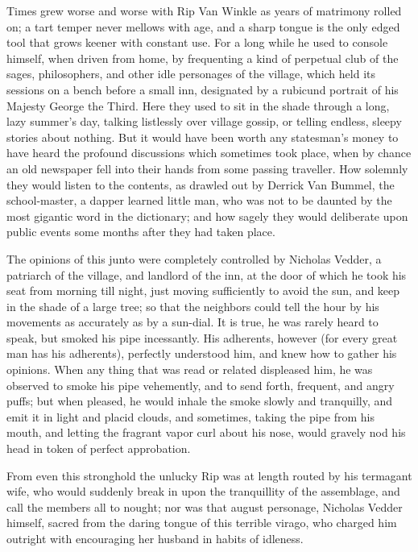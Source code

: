 Times grew worse and worse with Rip Van Winkle as years of matrimony rolled on; a tart temper never mellows with age, and a sharp tongue is the only edged tool that grows keener with constant use. For a long while he used to console himself, when driven from home, by frequenting a kind of perpetual club of the sages, philosophers, and other idle personages of the village, which held its sessions on a bench before a small inn, designated by a rubicund portrait of his Majesty George the Third. Here they used to sit in the shade through a long, lazy summer’s day, talking listlessly over village gossip, or telling endless, sleepy stories about nothing. But it would have been worth any statesman’s money to have heard the profound discussions which sometimes took place, when by chance an old newspaper fell into their hands from some passing traveller. How solemnly they would listen to the contents, as drawled out by Derrick Van Bummel, the school-master, a dapper learned little man, who was not to be daunted by the most gigantic word in the dictionary; and how sagely they would deliberate upon public events some months after they had taken place.

The opinions of this junto were completely controlled by Nicholas Vedder, a patriarch of the village, and landlord of the inn, at the door of which he took his seat from morning till night, just moving sufficiently to avoid the sun, and keep in the shade of a large tree; so that the neighbors could tell the hour by his movements as accurately as by a sun-dial. It is true, he was rarely heard to speak, but smoked his pipe incessantly. His adherents, however (for every great man has his adherents), perfectly understood him, and knew how to gather his opinions. When any thing that was read or related displeased him, he was observed to smoke his pipe vehemently, and to send forth, frequent, and angry puffs; but when pleased, he would inhale the smoke slowly and tranquilly, and emit it in light and placid clouds, and sometimes, taking the pipe from his mouth, and letting the fragrant vapor curl about his nose, would gravely nod his head in token of perfect approbation.

From even this stronghold the unlucky Rip was at length routed by his termagant wife, who would suddenly break in upon the tranquillity of the assemblage, and call the members all to nought; nor was that august personage, Nicholas Vedder himself, sacred from the daring tongue of this terrible virago, who charged him outright with encouraging her husband in habits of idleness.

